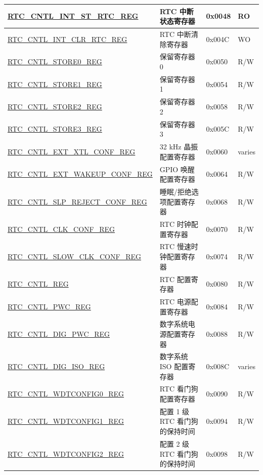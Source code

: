 \begin{longtable}{ | l | l | p{1.3cm} | p{1cm} | }
\hyperref[regdesc:RTCCNTLINTSTRTCREG]{RTC\_CNTL\_INT\_ST\_RTC\_REG} & RTC 中断状态寄存器 & 0x0048 & RO \\ \hline
\hyperref[regdesc:RTCCNTLINTCLRRTCREG]{RTC\_CNTL\_INT\_CLR\_RTC\_REG} & RTC 中断清除寄存器 & 0x004C & WO \\ \hline
\hyperref[regdesc:RTCCNTLSTORE0REG]{RTC\_CNTL\_STORE0\_REG} & 保留寄存器 0 & 0x0050 & R/W \\ \hline
\hyperref[regdesc:RTCCNTLSTORE1REG]{RTC\_CNTL\_STORE1\_REG} & 保留寄存器 1 & 0x0054 & R/W \\ \hline
\hyperref[regdesc:RTCCNTLSTORE2REG]{RTC\_CNTL\_STORE2\_REG} & 保留寄存器 2 & 0x0058 & R/W \\ \hline
\hyperref[regdesc:RTCCNTLSTORE3REG]{RTC\_CNTL\_STORE3\_REG} & 保留寄存器 3 & 0x005C & R/W \\ \hline
\hyperref[regdesc:RTCCNTLEXTXTLCONFREG]{RTC\_CNTL\_EXT\_XTL\_CONF\_REG} & 32 kHz 晶振配置寄存器 & 0x0060 & varies \\ \hline
\hyperref[regdesc:RTCCNTLEXTWAKEUPCONFREG]{RTC\_CNTL\_EXT\_WAKEUP\_CONF\_REG} & GPIO 唤醒配置寄存器 & 0x0064 & R/W \\ \hline
\hyperref[regdesc:RTCCNTLSLPREJECTCONFREG]{RTC\_CNTL\_SLP\_REJECT\_CONF\_REG} & 睡眠/拒绝选项配置寄存器 & 0x0068 & R/W \\ \hline
\hyperref[regdesc:RTCCNTLCLKCONFREG]{RTC\_CNTL\_CLK\_CONF\_REG} & RTC 时钟配置寄存器 & 0x0070 & R/W \\ \hline
\hyperref[regdesc:RTCCNTLSLOWCLKCONFREG]{RTC\_CNTL\_SLOW\_CLK\_CONF\_REG} & RTC 慢速时钟配置寄存器 & 0x0074 & R/W \\ \hline
\hyperref[regdesc:RTCCNTLREG]{RTC\_CNTL\_REG} & RTC 配置寄存器 & 0x0080 & R/W \\ \hline
\hyperref[regdesc:RTCCNTLPWCREG]{RTC\_CNTL\_PWC\_REG} & RTC 电源配置寄存器 & 0x0084 & R/W \\ \hline
\hyperref[regdesc:RTCCNTLDIGPWCREG]{RTC\_CNTL\_DIG\_PWC\_REG} & 数字系统电源配置寄存器 & 0x0088 & R/W \\ \hline
\hyperref[regdesc:RTCCNTLDIGISOREG]{RTC\_CNTL\_DIG\_ISO\_REG} & 数字系统 ISO 配置寄存器 & 0x008C & varies \\ \hline
\hyperref[regdesc:RTCCNTLWDTCONFIG0REG]{RTC\_CNTL\_WDTCONFIG0\_REG} & RTC 看门狗配置寄存器 & 0x0090 & R/W \\ \hline
\hyperref[regdesc:RTCCNTLWDTCONFIG1REG]{RTC\_CNTL\_WDTCONFIG1\_REG} & 配置 1 级 RTC 看门狗的保持时间 & 0x0094 & R/W \\ \hline
\hyperref[regdesc:RTCCNTLWDTCONFIG2REG]{RTC\_CNTL\_WDTCONFIG2\_REG} & 配置 2 级 RTC 看门狗的保持时间 & 0x0098 & R/W \\ \hline

\end{longtable}
